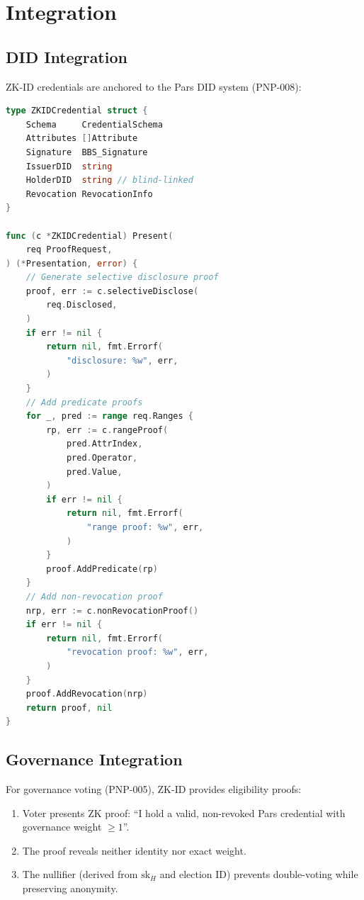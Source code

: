 \documentclass[11pt,a4paper]{article}
\begin{document}
\section{Integration}
\label{sec:integration}

\subsection{DID Integration}

ZK-ID credentials are anchored to the Pars DID system (PNP-008):

\begin{lstlisting}[language=Go,caption={Credential-DID Binding}]
type ZKIDCredential struct {
    Schema     CredentialSchema
    Attributes []Attribute
    Signature  BBS_Signature
    IssuerDID  string
    HolderDID  string // blind-linked
    Revocation RevocationInfo
}

func (c *ZKIDCredential) Present(
    req ProofRequest,
) (*Presentation, error) {
    // Generate selective disclosure proof
    proof, err := c.selectiveDisclose(
        req.Disclosed,
    )
    if err != nil {
        return nil, fmt.Errorf(
            "disclosure: %w", err,
        )
    }
    // Add predicate proofs
    for _, pred := range req.Ranges {
        rp, err := c.rangeProof(
            pred.AttrIndex,
            pred.Operator,
            pred.Value,
        )
        if err != nil {
            return nil, fmt.Errorf(
                "range proof: %w", err,
            )
        }
        proof.AddPredicate(rp)
    }
    // Add non-revocation proof
    nrp, err := c.nonRevocationProof()
    if err != nil {
        return nil, fmt.Errorf(
            "revocation proof: %w", err,
        )
    }
    proof.AddRevocation(nrp)
    return proof, nil
}
\end{lstlisting}

\subsection{Governance Integration}

For governance voting (PNP-005), ZK-ID provides eligibility proofs:

\begin{enumerate}
    \item Voter presents ZK proof: ``I hold a valid, non-revoked Pars
    credential with governance weight $\geq 1$''.
    \item The proof reveals neither identity nor exact weight.
    \item The nullifier (derived from $\mathrm{sk}_H$ and election ID)
    prevents double-voting while preserving anonymity.
\end{enumerate}
\end{document}
